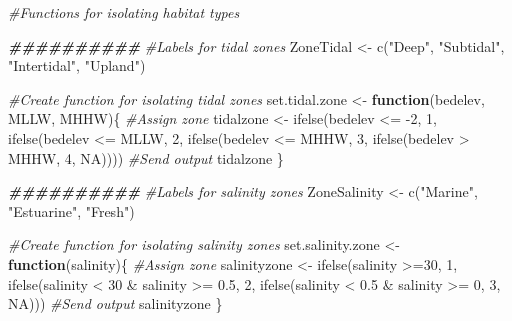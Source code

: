 \documentclass[
]{book}
\newenvironment{Shaded}{\begin{snugshade}}{\end{snugshade}}
\newcommand{\CommentTok}[1]{\textcolor[rgb]{0.56,0.35,0.01}{\textit{#1}}}
\newcommand{\ConstantTok}[1]{\textcolor[rgb]{0.00,0.00,0.00}{#1}}
\newcommand{\ControlFlowTok}[1]{\textcolor[rgb]{0.13,0.29,0.53}{\textbf{#1}}}
\newcommand{\DecValTok}[1]{\textcolor[rgb]{0.00,0.00,0.81}{#1}}
\newcommand{\DocumentationTok}[1]{\textcolor[rgb]{0.56,0.35,0.01}{\textbf{\textit{#1}}}}
\newcommand{\FloatTok}[1]{\textcolor[rgb]{0.00,0.00,0.81}{#1}}
\newcommand{\FunctionTok}[1]{\textcolor[rgb]{0.00,0.00,0.00}{#1}}
\newcommand{\NormalTok}[1]{#1}
\newcommand{\OtherTok}[1]{\textcolor[rgb]{0.56,0.35,0.01}{#1}}
\newcommand{\SpecialCharTok}[1]{\textcolor[rgb]{0.00,0.00,0.00}{#1}}
\newcommand{\StringTok}[1]{\textcolor[rgb]{0.31,0.60,0.02}{#1}}
\begin{document}
\begin{Shaded}
\begin{Highlighting}[]
\CommentTok{\#Functions for isolating habitat types}

\DocumentationTok{\#\#\#\#\#\#\#\#\#\#}
\CommentTok{\#Labels for tidal zones}
\NormalTok{ZoneTidal }\OtherTok{\textless{}{-}} \FunctionTok{c}\NormalTok{(}\StringTok{"Deep"}\NormalTok{, }\StringTok{"Subtidal"}\NormalTok{, }\StringTok{"Intertidal"}\NormalTok{, }\StringTok{"Upland"}\NormalTok{)}

\CommentTok{\#Create function for isolating tidal zones}
\NormalTok{set.tidal.zone }\OtherTok{\textless{}{-}} \ControlFlowTok{function}\NormalTok{(bedelev, MLLW, MHHW)\{}
  \CommentTok{\#Assign zone}
\NormalTok{  tidalzone }\OtherTok{\textless{}{-}} \FunctionTok{ifelse}\NormalTok{(bedelev }\SpecialCharTok{\textless{}=} \SpecialCharTok{{-}}\DecValTok{2}\NormalTok{, }\DecValTok{1}\NormalTok{,}
          \FunctionTok{ifelse}\NormalTok{(bedelev }\SpecialCharTok{\textless{}=}\NormalTok{ MLLW, }\DecValTok{2}\NormalTok{,}
          \FunctionTok{ifelse}\NormalTok{(bedelev }\SpecialCharTok{\textless{}=}\NormalTok{ MHHW, }\DecValTok{3}\NormalTok{, }
          \FunctionTok{ifelse}\NormalTok{(bedelev }\SpecialCharTok{\textgreater{}}\NormalTok{ MHHW, }\DecValTok{4}\NormalTok{, }\ConstantTok{NA}\NormalTok{))))}
  \CommentTok{\#Send output}
\NormalTok{  tidalzone}
\NormalTok{\}}

\DocumentationTok{\#\#\#\#\#\#\#\#\#\#}
\CommentTok{\#Labels for salinity zones}
\NormalTok{ZoneSalinity }\OtherTok{\textless{}{-}} \FunctionTok{c}\NormalTok{(}\StringTok{"Marine"}\NormalTok{, }\StringTok{"Estuarine"}\NormalTok{, }\StringTok{"Fresh"}\NormalTok{)}

\CommentTok{\#Create function for isolating salinity zones}
\NormalTok{set.salinity.zone }\OtherTok{\textless{}{-}} \ControlFlowTok{function}\NormalTok{(salinity)\{}
  \CommentTok{\#Assign zone}
\NormalTok{  salinityzone }\OtherTok{\textless{}{-}} \FunctionTok{ifelse}\NormalTok{(salinity }\SpecialCharTok{\textgreater{}=}\DecValTok{30}\NormalTok{, }\DecValTok{1}\NormalTok{, }
                  \FunctionTok{ifelse}\NormalTok{(salinity }\SpecialCharTok{\textless{}} \DecValTok{30} \SpecialCharTok{\&}\NormalTok{ salinity }\SpecialCharTok{\textgreater{}=} \FloatTok{0.5}\NormalTok{, }\DecValTok{2}\NormalTok{, }
                  \FunctionTok{ifelse}\NormalTok{(salinity }\SpecialCharTok{\textless{}} \FloatTok{0.5} \SpecialCharTok{\&}\NormalTok{ salinity }\SpecialCharTok{\textgreater{}=} \DecValTok{0}\NormalTok{, }\DecValTok{3}\NormalTok{, }\ConstantTok{NA}\NormalTok{)))}
  \CommentTok{\#Send output}
\NormalTok{  salinityzone}
\NormalTok{\}}


\end{Highlighting}
\end{Shaded}
\end{document}
